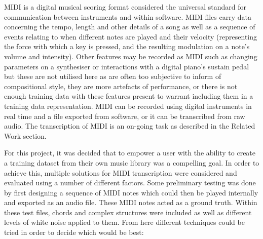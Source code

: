 \documentclass[12pt,]{article}
\begin{document}
MIDI is a digital musical scoring format considered the universal
standard for communication between instruments and within software. MIDI
files carry data concerning the tempo, length and other details of a
song as well as a sequence of events relating to when different notes
are played and their velocity (representing the force with which a key
is pressed, and the resulting modulation on a note's volume and
intensity). Other features may be recorded as MIDI such as changing
parameters on a synthesiser or interactions with a digital piano's
sustain pedal but these are not utilised here as are often too
subjective to inform of compositional style, they are more artefacts of
performance, or there is not enough training data with these features
present to warrant including them in a training data representation.
MIDI can be recorded using digital instruments in real time and a file
exported from software, or it can be transcribed from raw audio. The
transcription of MIDI is an on-going task as described in the Related
Work section.

For this project, it was decided that to empower a user with the ability
to create a training dataset from their own music library was a
compelling goal. In order to achieve this, multiple solutions for MIDI
transcription were considered and evaluated using a number of different
factors. Some preliminary testing was done by first designing a sequence
of MIDI notes which could then be played internally and exported as an
audio file. These MIDI notes acted as a ground truth. Within these test
files, chords and complex structures were included as well as different
levels of white noise applied to them. From here different techniques
could be tried in order to decide which would be best:
\end{document}

